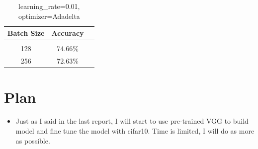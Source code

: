 \documentclass{article} %
\begin{document}
\begin{itemize}
\begin{table}[h]
\caption{learning\_rate=0.01, optimizer=Adadelta}
\begin{center}
\begin{tabular}{c|c|c}
\multicolumn{1}{c}{\bf Batch Size} &\multicolumn{1}{c}{\bf Accuracy}
\\ \hline \\
128 & 74.66\% \\
256 & 72.63\% \\
\end{tabular}
\end{center}
\end{table}

\end{itemize}

\section{Plan}
\begin{itemize}
\item Just as I said in the last report, I will start to use pre-trained VGG to build model and fine tune the model with cifar10. Time is limited, I will do as more as possible.
\end{itemize}
\end{document}
